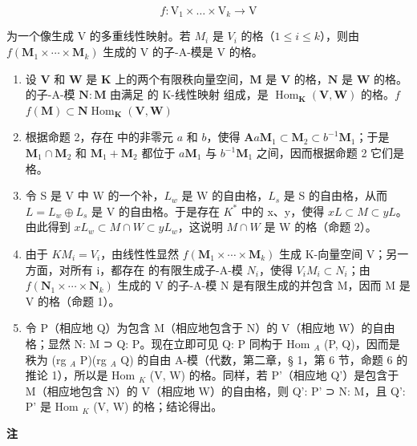 \[
f \colon \mathrm{V} _ {1} \times \dots \times \mathrm{V} _ {k} \rightarrow \mathrm{V}
\]

为一个像生成 V 的多重线性映射。若 \(M_{i}\) 是 \(V_{i}\) 的格（\(1 \leqslant i \leqslant k\)），则由 \(f(\mathbf{M}_{1} \times \cdots \times \mathbf{M}_{k})\) 生成的 V 的子-A-模是 V 的格。

\begin{enumerate}
\def\labelenumi{(\roman{enumi})}
\setcounter{enumi}{3}
\item
  设 \(\mathbf{V}\) 和 \(\mathbf{W}\) 是 \(\mathbf{K}\) 上的两个有限秩向量空间，\(\mathbf{M}\) 是 \(\mathbf{V}\) 的格，\(\mathbf{N}\) 是 \(\mathbf{W}\) 的格。 的子-A-模 \(\mathbf{N}:\mathbf{M}\) 由满足  的 K-线性映射  组成，是 \(\operatorname{Hom}_{\mathbf{K}}(\mathbf{V},\mathbf{W})\) 的格。\(f\)\(f(\mathbf{M})\subset \mathbf{N}\)\(\operatorname{Hom}_{\mathbf{K}}(\mathbf{V},\mathbf{W})\)
\item
  根据命题 2，存在  中的非零元 \(a\) 和 \(b\)，使得 \(\mathbf{A}\)\(a\mathbf{M}_1 \subset \mathbf{M}_2 \subset b^{-1}\mathbf{M}_1\)；于是 \(\mathbf{M}_1 \cap \mathbf{M}_2\) 和 \(\mathbf{M}_1 + \mathbf{M}_2\) 都位于 \(a\mathbf{M}_1\) 与 \(b^{-1}\mathbf{M}_1\) 之间，因而根据命题 2 它们是格。
\item
  令 S 是 V 中 W 的一个补，\(L_{w}\) 是 W 的自由格，\(L_{s}\) 是 S 的自由格，从而 \(L = L_{w} \oplus L_{s}\) 是 V 的自由格。于是存在 \(K^{*}\) 中的 x、y，使得 \(xL \subset M \subset yL\)。由此得到 \(xL_{w} \subset M \cap W \subset yL_{w}\)，这说明 \(M \cap W\) 是 W 的格（命题 2）。
\item
  由于 \(KM_{i} = V_{i}\)，由线性性显然 \(f(\mathbf{M}_{1} \times \cdots \times \mathbf{M}_{k})\) 生成 K-向量空间 V；另一方面，对所有 i，都存在  的有限生成子-A-模 \(N_{i}\)，使得 \(V_{i}\)\(M_{i} \subset N_{i}\)；由 \(f(\mathbf{N}_{1} \times \cdots \times \mathbf{N}_{k})\) 生成的 V 的子-A-模 N 是有限生成的并包含 M，因而 M 是 V 的格（命题 1）。
\item
  令 P（相应地 Q）为包含 M（相应地包含于 N）的 V（相应地 W）的自由格；显然 N: M ⊃ Q: P。现在立即可见 Q: P 同构于 Hom \(_{A}\) (P, Q)，因而是秩为 (rg \(_{A}\) P)(rg \(_{A}\) Q) 的自由 A-模（代数，第二章，§ 1，第 6 节，命题 6 的推论 1），所以是 Hom \(_{K}\) (V, W) 的格。同样，若 P'（相应地 Q'）是包含于 M（相应地包含 N）的 V（相应地 W）的自由格，则 Q': P' ⊃ N: M，且 Q': P' 是 Hom \(_{K}\) (V, W) 的格；结论得出。
\end{enumerate}

\textbf{注}\par

